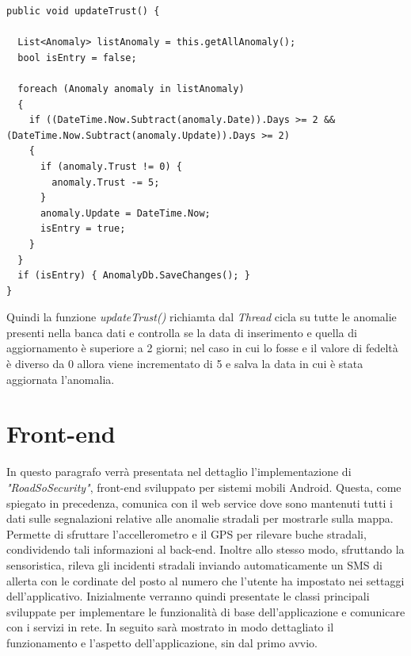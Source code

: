 \documentclass[a4paper, 11pt]{article} %
\begin{document}
\begin{lstlisting}
public void updateTrust() {

  List<Anomaly> listAnomaly = this.getAllAnomaly();
  bool isEntry = false;

  foreach (Anomaly anomaly in listAnomaly)
  {
    if ((DateTime.Now.Subtract(anomaly.Date)).Days >= 2 && (DateTime.Now.Subtract(anomaly.Update)).Days >= 2)
    {
      if (anomaly.Trust != 0) { 
        anomaly.Trust -= 5; 
      }
      anomaly.Update = DateTime.Now;
      isEntry = true;
    }
  }
  if (isEntry) { AnomalyDb.SaveChanges(); }
}
\end{lstlisting}
Quindi la funzione \textit{updateTrust()} richiamta dal \textit{Thread} cicla su tutte le anomalie presenti nella banca dati e controlla se la data di inserimento e quella di aggiornamento è superiore a 2 giorni; nel caso in cui lo fosse e il valore di fedeltà è diverso da 0 allora viene incrementato di 5 e salva la data in cui è stata aggiornata l'anomalia.

\section{Front-end}
In questo paragrafo verrà presentata nel dettaglio l’implementazione di \textit{"RoadSoSecurity"}, front-end sviluppato per sistemi mobili Android. Questa, come spiegato in precedenza, comunica con il web service dove sono mantenuti tutti i dati sulle segnalazioni relative alle anomalie stradali per mostrarle sulla mappa. Permette di sfruttare l'accellerometro e il GPS per rilevare buche stradali, condividendo tali informazioni al back-end. Inoltre allo stesso modo, sfruttando la sensoristica, rileva gli incidenti stradali inviando automaticamente un SMS di allerta con le cordinate del posto al numero che l'utente ha impostato nei settaggi dell'applicativo. Inizialmente verranno quindi presentate le classi principali sviluppate per implementare le funzionalità di base dell’applicazione e comunicare con i servizi in rete. In seguito sarà mostrato in modo dettagliato il funzionamento e l’aspetto dell’applicazione, sin dal primo avvio.
\end{document}
